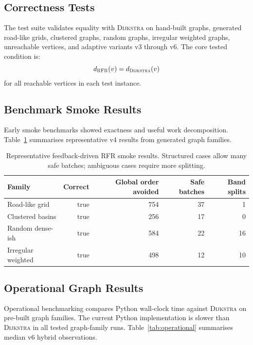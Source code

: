 \documentclass[11pt]{article}
\newcommand{\RFR}{\textsc{RFR}}
\newcommand{\Dijkstra}{\textsc{Dijkstra}}
\begin{document}
\subsection{Correctness Tests}

The test suite validates equality with \Dijkstra{} on hand-built graphs, generated road-like grids, clustered graphs, random graphs, irregular weighted graphs, unreachable vertices, and adaptive variants v3 through v6. The core tested condition is:
\[
  d_{\RFR}(v)=d_{\Dijkstra}(v)
\]
for all reachable vertices in each test instance.

\subsection{Benchmark Smoke Results}

Early smoke benchmarks showed exactness and useful work decomposition. Table~\ref{tab:smoke} summarises representative v4 results from generated graph families.

\begin{table}[h]
\centering
\begin{tabular}{lrrrr}
\toprule
Family & Correct & Global order avoided & Safe batches & Band splits \\
\midrule
Road-like grid & true & 754 & 37 & 1 \\
Clustered basins & true & 256 & 17 & 0 \\
Random dense-ish & true & 584 & 22 & 16 \\
Irregular weighted & true & 498 & 12 & 10 \\
\bottomrule
\end{tabular}
\caption{Representative feedback-driven \RFR{} smoke results. Structured cases allow many safe batches; ambiguous cases require more splitting.}
\label{tab:smoke}
\end{table}

\subsection{Operational Graph Results}

Operational benchmarking compares Python wall-clock time against \Dijkstra{} on pre-built graph families. The current Python implementation is slower than \Dijkstra{} in all tested graph-family runs. Table~\ref{tab:operational} summarises median v6 hybrid observations.
\end{document}
